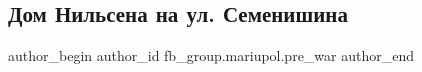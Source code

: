  
 
 
 
 

\subsection{Дом Нильсена на ул. Семенишина}
\label{sec:10_02_2023.fb.fb_group.mariupol.pre_war.3.dom_nilsena_na_ul__s}

\ifcmt
 author_begin
   author_id fb_group.mariupol.pre_war
 author_end
\fi
